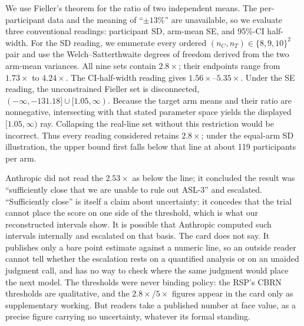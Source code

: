 \documentclass{article}
\begin{document}
We use Fieller's theorem \citep{fieller1954} for the ratio of two independent means. The
per-participant data and the meaning of ``$\pm13\%$'' are unavailable, so we evaluate three
conventional readings: participant SD, arm-mean SE, and 95\%-CI half-width. For the SD
reading, we enumerate every ordered $(n_C,n_T)\in\{8,9,10\}^2$ pair and use the
Welch--Satterthwaite degrees of freedom derived from the two arm-mean variances. All nine
sets contain $2.8\times$; their endpoints range from $1.73\times$ to $4.24\times$.
The CI-half-width reading gives $1.56\times$--$5.35\times$. Under the SE reading, the
unconstrained Fieller set is disconnected,
$(-\infty,-131.18]\cup[1.05,\infty)$. Because the target arm means and their ratio are
nonnegative, intersecting with that stated parameter space yields the displayed
$[1.05,\infty)$ ray. Collapsing the real-line set without this restriction would be
incorrect. Thus every reading considered retains $2.8\times$; under the equal-arm SD
illustration, the upper bound first falls below that line at about 119 participants per arm.

Anthropic did not read the $2.53\times$ as below the line; it concluded the result was ``sufficiently close that we are unable to rule out ASL-3'' and escalated. ``Sufficiently close'' is itself a claim about uncertainty: it concedes that the trial cannot place the score on one side of the threshold, which is what our reconstructed intervals show. It is possible that Anthropic computed such intervals internally and escalated on that basis. The card does not say. It publishes only a bare point estimate against a numeric line, so an outside reader cannot tell whether the escalation rests on a quantified analysis or on an unaided judgment call, and has no way to check where the same judgment would place the next model. The thresholds were never binding policy: the RSP's CBRN thresholds are qualitative, and the $2.8\times$/$5\times$ figures appear in the card only as supplementary working. But readers take a published number at face value, as a precise figure carrying no uncertainty, whatever its formal standing.
\end{document}
